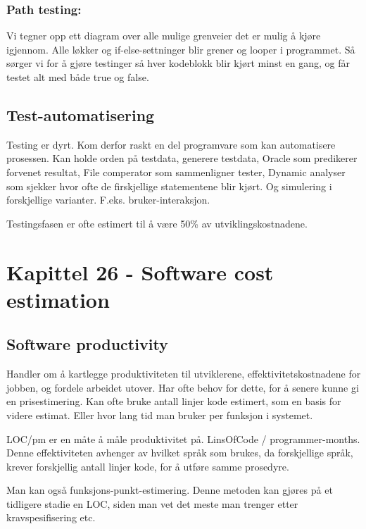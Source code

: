 \documentclass[11pt]{article}
\begin{document}
\subsubsection{Path testing:}
\label{sec-9.2.9}

    Vi tegner opp ett diagram over alle mulige grenveier det er mulig å kjøre igjennom. 
    Alle løkker og if-else-settninger blir grener  og looper i programmet. Så sørger vi for 
    å gjøre testinger så hver kodeblokk blir kjørt minst en gang, og får testet alt med både true og false.
    
\subsection{Test-automatisering}
\label{sec-9.3}


   Testing er dyrt. Kom derfor raskt en del programvare som kan automatisere prosessen. 
   Kan holde orden på testdata, generere testdata, Oracle som predikerer forvenet resultat, 
   File comperator som sammenligner tester, Dynamic analyser som sjekker hvor ofte de firskjellige
   statementene blir kjørt. Og simulering i forskjellige varianter. F.eks. bruker-interaksjon.

   Testingsfasen er ofte estimert til å være 50\% av utviklingskostnadene.
\section{Kapittel 26 - Software cost estimation}
\label{sec-10}
\subsection{Software productivity}
\label{sec-10.1}

   Handler om å kartlegge produktiviteten til utviklerene, effektivitetskostnadene 
   for jobben, og fordele arbeidet utover. Har ofte behov for dette, for å senere 
   kunne gi en prisestimering. Kan ofte bruke antall linjer kode estimert, som en basis 
   for videre estimat. Eller hvor lang tid man bruker per funksjon i systemet. 

   LOC/pm er en måte å måle produktivitet på. LinsOfCode / programmer-months. 
   Denne effektiviteten avhenger av hvilket språk som brukes, da forskjellige språk, 
   krever forskjellig antall linjer kode, for å utføre samme prosedyre.

   Man kan også funksjons-punkt-estimering. Denne metoden kan gjøres på et tidligere 
   stadie en LOC, siden man vet det meste man trenger etter kravspesifisering etc.
\end{document}
